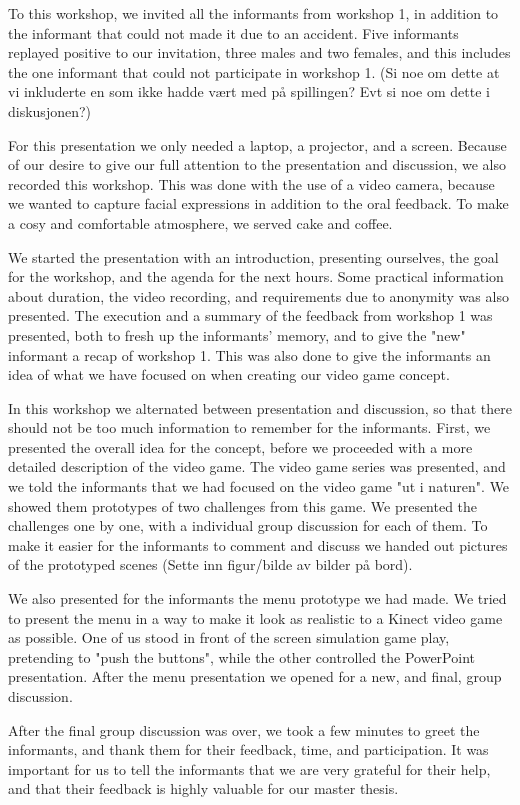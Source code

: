 To this workshop, we invited all the informants from workshop 1, in addition to the informant that could not made it due to an accident. Five informants replayed positive to our invitation, three males and two females, and this includes the one informant that could not participate in workshop 1. (Si noe om dette at vi inkluderte en som ikke hadde vært med på spillingen? Evt si noe om dette i diskusjonen?)

For this presentation we only needed a laptop, a projector, and a screen. Because of our desire to give our full attention to the presentation and discussion, we also recorded this workshop. This was done with the use of a video camera, because we wanted to capture facial expressions in addition to the oral feedback. To make a cosy and comfortable atmosphere, we served cake and coffee.   

We started the presentation with an introduction, presenting ourselves, the goal for the workshop, and the agenda for the next hours. Some practical information about duration, the video recording, and requirements due to anonymity was also presented. The execution and a summary of the feedback from workshop 1 was presented, both to fresh up the informants' memory, and to give the "new" informant a recap of workshop 1. This was also done to give the informants an idea of what we have focused on when creating our video game concept.        

In this workshop we alternated between presentation and discussion, so that there should not be too much information to remember for the informants. First, we presented the overall idea for the concept, before we proceeded with a more detailed description of the video game. The video game series was presented, and we told the informants that we had focused on the video game "ut i naturen". We showed them prototypes of two challenges from this game. We presented the challenges one by one, with a individual group discussion for each of them. To make it easier for the informants to comment and discuss we handed out pictures of the prototyped scenes (Sette inn figur/bilde av bilder på bord). 

We also presented for the informants the menu prototype we had made. We tried to present the menu in a way to make it look as realistic to a Kinect video game as possible. One of us stood in front of the screen simulation game play, pretending to "push the buttons", while the other controlled the PowerPoint presentation.  After the menu presentation we opened for a new, and final, group discussion. 

After the final group discussion was over, we took a few minutes to greet the informants, and thank them for their feedback, time, and participation. It was important for us to tell the informants that we are very grateful for their help, and that their feedback is highly valuable for our master thesis.    

 